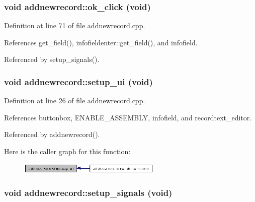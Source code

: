\subsubsection{\setlength{\rightskip}{0pt plus 5cm}void addnewrecord::ok\_\-click (void)\hspace{0.3cm}{\tt  [private, slot]}}\label{classaddnewrecord_67eaa32fb215ac1ee6fa45f118bd26d9}




Definition at line 71 of file addnewrecord.cpp.

References get\_\-field(), infofieldenter::get\_\-field(), and infofield.

Referenced by setup\_\-signals().
\subsubsection{\setlength{\rightskip}{0pt plus 5cm}void addnewrecord::setup\_\-ui (void)\hspace{0.3cm}{\tt  [private]}}\label{classaddnewrecord_80133fefeb4b5d183232f13b6d96ca60}




Definition at line 26 of file addnewrecord.cpp.

References buttonbox, ENABLE\_\-ASSEMBLY, infofield, and recordtext\_\-editor.

Referenced by addnewrecord().

Here is the caller graph for this function:\begin{figure}[H]
\begin{center}
\leavevmode
\includegraphics[width=193pt]{classaddnewrecord_80133fefeb4b5d183232f13b6d96ca60_icgraph}
\end{center}
\end{figure}
\subsubsection{\setlength{\rightskip}{0pt plus 5cm}void addnewrecord::setup\_\-signals (void)\hspace{0.3cm}{\tt  [private]}}\label{classaddnewrecord_16b5cb93b2861de3fb4da880a09a683f}




